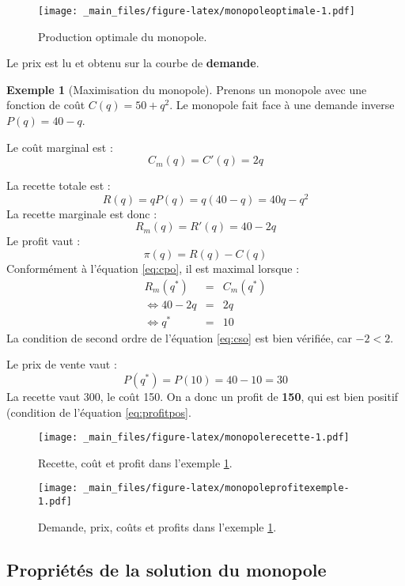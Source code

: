 \documentclass[
  a4paper,
]{book}
\theoremstyle{definition}
\theoremstyle{definition}
\newtheorem{example}{Exemple}[chapter]
\theoremstyle{definition}
\theoremstyle{definition}
\theoremstyle{remark}
\begin{document}
\begin{figure}
\centering
\texttt{[image: \_main\_files/figure-latex/monopoleoptimale-1.pdf]}
\caption{\label{fig:monopoleoptimale}Production optimale du monopole.}
\end{figure}

Le prix est lu et obtenu sur la courbe de \textbf{demande}.

\begin{example}[Maximisation du monopole]
\protect\hypertarget{exm:monopoleexemple}{}\label{exm:monopoleexemple}Prenons un monopole avec une fonction de coût \(C(q)=50+q^2\).
Le monopole fait face à une demande inverse \(P(q) = 40-q\).

Le coût marginal est :
\[
C_m(q) = C'(q)=2q
\]

La recette totale est :
\[
R(q) = qP(q) = q(40-q) = 40q-q^2
\]
La recette marginale est donc :
\[
R_m(q) = R'(q) = 40 - 2q
\]
Le profit vaut :
\[
\pi(q) = R(q)-C(q)
\]
Conformément à l'équation \eqref{eq:cpo}, il est maximal lorsque :
\[
\begin{array}{rcl}
R_m(q^*) &=&C_m(q^*)\\
\Leftrightarrow 40 -2q &= &2q\\
\Leftrightarrow q^*&=&10
\end{array}
\]
La condition de second ordre de l'équation \eqref{eq:cso} est bien vérifiée, car \(-2<2\).

Le prix de vente vaut :
\[P(q^*) = P(10) = 40-10 = 30\]
La recette vaut 300, le coût 150.
On a donc un profit de \textbf{150}, qui est bien positif (condition de l'équation \eqref{eq:profitpos}.
\end{example}

\begin{figure}
\centering
\texttt{[image: \_main\_files/figure-latex/monopolerecette-1.pdf]}
\caption{\label{fig:monopolerecette}Recette, coût et profit dans l'exemple \ref{exm:monopoleexemple}.}
\end{figure}

\begin{figure}
\centering
\texttt{[image: \_main\_files/figure-latex/monopoleprofitexemple-1.pdf]}
\caption{\label{fig:monopoleprofitexemple}Demande, prix, coûts et profits dans l'exemple \ref{exm:monopoleexemple}.}
\end{figure}

\hypertarget{propriuxe9tuxe9s-de-la-solution-du-monopole}{%
\subsection{Propriétés de la solution du monopole}\label{propriuxe9tuxe9s-de-la-solution-du-monopole}}
\end{document}
